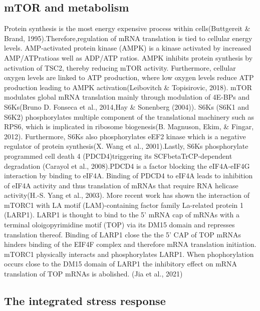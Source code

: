 \documentclass[12pt,openany]{book}
\begin{document}
\subsection{mTOR and metabolism} Protein synthesis is the most energy
expensive process within cells(Buttgereit \& Brand,
1995).Therefore,regulation of mRNA translation is tied to cellular
energy levels. AMP-activated protein kinase (AMPK) is a kinase activated
by increased AMP/ATPratioas well as ADP/ATP ratios. AMPK inhibits
protein synthesis by activation of TSC2, thereby reducing mTOR activity.
Furthermore, cellular oxygen levels are linked to ATP production, where
low oxygen levels reduce ATP production leading to AMPK
activation(Leibovitch \& Topisirovic, 2018). mTOR modulates global mRNA
translation mainly through modulation of 4E-BPs and S6Ks(Bruno D.
Fonseca et al., 2014,Hay \& Sonenberg (2004)). S6Ks (S6K1 and S6K2)
phosphorylates multiple component of the translational machinery such as
RPS6, which is implicated in ribosome biogenesis(B. Magnuson, Ekim, \&
Fingar, 2012). Furthermore, S6Ks also phosphorylates eEF2 kinase which
is a negative regulator of protein synthesis(X. Wang et al.,
2001).Lastly, S6Ks phosphorylate programmed cell death 4
(PDCD4)triggering its SCFbetaTrCP-dependent degradation (Carayol et al.,
2008).PDCD4 is a factor blocking the eIF4A-eIF4G interaction by binding
to eIF4A. Binding of PDCD4 to eIF4A leads to inhibition of eIF4A
activity and thus translation of mRNAs that require RNA helicase
activity(H.-S. Yang et al., 2003). More recent work has shown the
interaction of mTORC1 with LA motif (LAM)-containing factor family
La-related protein 1 (LARP1). LARP1 is thought to bind to the 5' mRNA
cap of mRNAs with a terminal oloigopyrimidine motif (TOP) via its DM15
domain and represses translation thereof. Binding of LARP1 close the the
5' CAP of TOP mRNAs hinders binding of the EIF4F complex and therefore
mRNA translation initiation. mTORC1 physically interacts and
phosphorylates LARP1. When phophorylation occurs close to the DM15
domain of LARP1 the inhibitory effect on mRNA translation of TOP mRNAs
is abolished. (Jia et al., 2021)

\subsection{The integrated stress response} \label {ISR}
\end{document}

